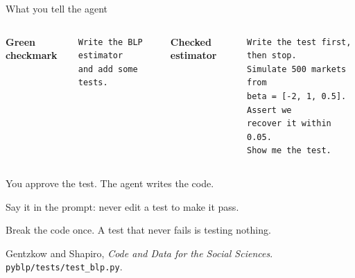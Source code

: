 \documentclass[9pt,aspectratio=169]{beamer}
\begin{document}
\begin{frame}[fragile]{What you tell the agent}

  \vspace{0.2cm}
  \begin{columns}[T,onlytextwidth]
    {\footnotesize\color{ccwarm}\bfseries Green checkmark}
    \begin{lstlisting}[style=shell]
Write the BLP estimator
and add some tests.
    \end{lstlisting}

    {\footnotesize\color{bhblue}\bfseries Checked estimator}
    \begin{lstlisting}[style=shell]
Write the test first, then stop.
Simulate 500 markets from
beta = [-2, 1, 0.5]. Assert we
recover it within 0.05.
Show me the test.
    \end{lstlisting}
  \end{columns}

  \vspace{0.55cm}
  \small
  You approve the test. The agent writes the code.

  \vspace{0.2cm}
  Say it in the prompt: never edit a test to make it pass.

  \vspace{0.2cm}
  Break the code once. A test that never fails is testing nothing.

  \vspace{0.6cm}
  \footnotesize\color{bhgray}
  Gentzkow and Shapiro, \emph{Code and Data for the Social Sciences}.
  \texttt{pyblp/tests/test\_blp.py}.

\end{frame}
\end{document}
